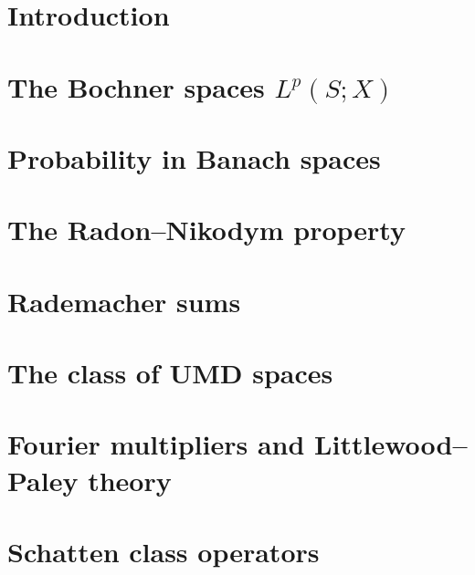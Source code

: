 \documentclass[a4paper,10pt,intlimits,sumlimits]{amsart}
\begin{document}


\maketitle
\footnotesize
\tableofcontents
\normalsize

\section{Introduction}
\label{sec:intro}


\section{The Bochner spaces \texorpdfstring{$L^p(S;X)$}{Lp(S;X)}}
\label{sec:Bochner-spaces}


\section{Probability in Banach spaces}
\label{sec:martingales} 


\section{The Radon--Nikodym property}
\label{sec:RNP}


\section{Rademacher sums}
\label{sec:rademacher}


\section{The class of UMD spaces}
\label{sec:UMD}


\section{Fourier multipliers and Littlewood--Paley theory}
\label{sec:HT}


\section{Schatten class operators}
\label{sec:schatten}

\end{document}
